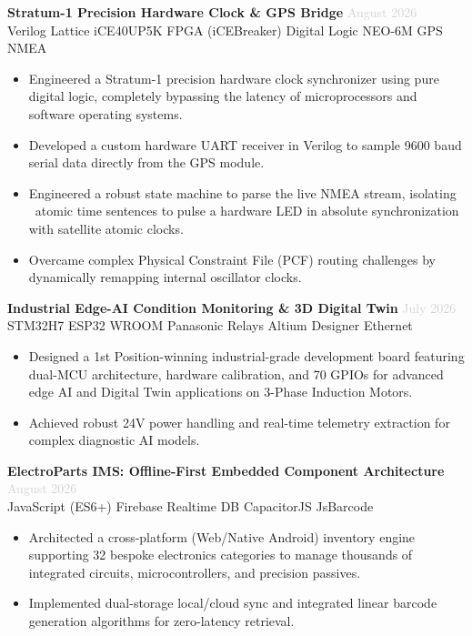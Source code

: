 \documentclass[a4paper,10pt]{article}
\begin{document}
\textbf{Stratum-1 Precision Hardware Clock \& GPS Bridge} \hfill {\small\textcolor{lightgray}{August 2026}}\\
{\small Verilog \textbar{} Lattice iCE40UP5K FPGA (iCEBreaker) \textbar{} Digital Logic \textbar{} NEO-6M GPS \textbar{} NMEA}
\begin{itemize}
  \item Engineered a Stratum-1 precision hardware clock synchronizer using pure digital logic, completely bypassing the latency of microprocessors and software operating systems.
  \item Developed a custom hardware UART receiver in Verilog to sample 9600 baud serial data directly from the GPS module.
  \item Engineered a robust state machine to parse the live NMEA stream, isolating \ atomic time sentences to pulse a hardware LED in absolute synchronization with satellite atomic clocks.
  \item Overcame complex Physical Constraint File (PCF) routing challenges by dynamically remapping internal oscillator clocks.
\end{itemize}
\vspace{3pt}

\textbf{Industrial Edge-AI Condition Monitoring \& 3D Digital Twin} \hfill {\small\textcolor{lightgray}{July 2026}}\\
{\small STM32H7 \textbar{} ESP32 WROOM \textbar{} Panasonic Relays \textbar{} Altium Designer \textbar{} Ethernet}
\begin{itemize}
  \item Designed a 1st Position-winning industrial-grade development board featuring dual-MCU architecture, hardware calibration, and 70 GPIOs for advanced edge AI and Digital Twin applications on 3-Phase Induction Motors.
  \item Achieved robust 24V power handling and real-time telemetry extraction for complex diagnostic AI models.
\end{itemize}
\vspace{3pt}

\textbf{ElectroParts IMS: Offline-First Embedded Component Architecture} \hfill {\small\textcolor{lightgray}{August 2026}}\\
{\small JavaScript (ES6+) \textbar{} Firebase Realtime DB \textbar{} CapacitorJS \textbar{} JsBarcode}
\begin{itemize}
  \item Architected a cross-platform (Web/Native Android) inventory engine supporting 32 bespoke electronics categories to manage thousands of integrated circuits, microcontrollers, and precision passives.
  \item Implemented dual-storage local/cloud sync and integrated linear barcode generation algorithms for zero-latency retrieval.
\end{itemize}
\vspace{3pt}
\end{document}
